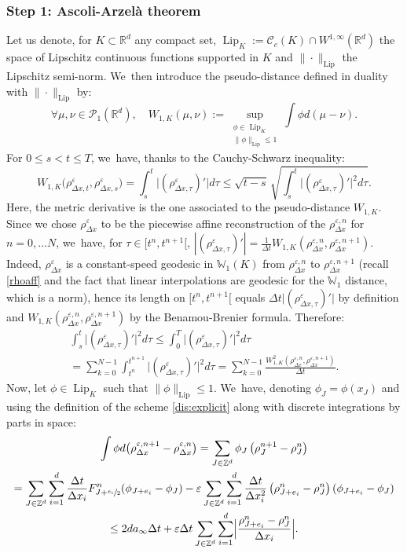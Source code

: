\documentclass[11pt]{article}
\numberwithin{equation}{section}
\DeclareMathOperator{\Lip}{Lip}
\def\RR{\mathbb{R}}
\def\ZZ{\mathbb{Z}}
\def\WW{\mathbb{W}}
\def\eps{\varepsilon}
\def\lip{\mathrm{Lip}}
\def\dt{\Delta t}
\def\dx{\Delta x}
\def\calC{{\mathcal C}}
\def\calP{{\mathcal P}}
\theoremstyle{plain}
\theoremstyle{definition}
\begin{document}
\subsubsection*{Step 1: Ascoli-Arzelà theorem} Let us denote, for $K \subset \RR^d$ any compact set, $\Lip_K := \calC_c(K) \cap W^{1,\infty}(\RR^d)$ the space of Lipschitz continuous functions supported in $K$ and $\|\cdot\|_{\lip}$ the Lipschitz semi-norm. We~then introduce the pseudo-distance defined in duality with $\|{\cdot}\|_{\lip}$ by:
\[
\forall \mu, \nu \in \calP_1(\RR^d), \quad W_{1,K}(\mu, \nu) := \sup_{\substack{\phi \in \Lip_K\\ \|\phi\|_{\lip} \leq 1}} \int \phi d(\mu-\nu).
\]
For $0\leq s < t \leq T$, we~have, thanks to the Cauchy-Schwarz inequality:
\begin{equation}\label{ineq:HolderW1K}
W_{1,K}\big(\rho_{\dx,t}^\eps, \rho_{\dx,s}^\eps\big) = \int_s^t \big|(\rho_{\dx, \tau}^\eps)'\big| d\tau \leq \sqrt{t-s} \, \sqrt{\int_s^t \big|(\rho_{\dx,\tau}^\eps)'\big|^2 d\tau}.
\end{equation}
Here, the metric derivative is the one associated to the pseudo-distance $W_{1,K}$. Since we chose $\rho_{\dx}^\eps$ to be the piecewise affine reconstruction of the $\rho_{\dx}^{\eps,n}$ for $n=0, \ldots N$, we~have, for $\tau \in [t^n, t^{n+1}[$, $ |(\rho_{\dx,\tau}^\eps)'| = \frac{1}{\dt} W_{1,K}(\rho_{\dx}^{\eps,n}, \rho_{\dx}^{\eps,n+1})$. Indeed, $\rho_{\dx}^\eps$ is a constant-speed geodesic in $\WW_1(K)$ from $\rho_{\dx}^{\eps,n}$ to $\rho_{\dx}^{\eps,n+1}$ (recall \eqref{rhoaff} and the fact that linear interpolations are geodesic for the $\WW_1$ distance, which is a norm), hence its length on $[t^n, t^{n+1}[$ equals $\dt\big|(\rho_{\dx,\tau}^\eps)'\big|$ by definition and $W_{1,K}(\rho_{\dx}^{\eps,n}, \rho_{\dx}^{\eps,n+1})$ by the Benamou-Brenier formula. Therefore:
\begin{multline}\label{eq:pff}
\int_s^t \big|(\rho_{\dx,\tau}^\eps)'\big|^2 d\tau \leq \int_0^T \big|(\rho_{\dx,\tau}^\eps)'\big|^2 d\tau \\
= \sum_{k=0}^{N-1} \int_{t^n}^{t^{n+1}} \big|(\rho_{\dx,\tau}^\eps)'\big|^2 d\tau = \sum_{k=0}^{N-1} \frac{W_{1,K}^2(\rho_{\dx}^{\eps,n}, \rho_{\dx}^{\eps,n+1})}{\dt}.
\end{multline}
Now, let $\phi \in \Lip_K$ such that $\|\phi\|_{\lip} \leq 1$. We~have, denoting $\phi_J = \phi(x_J)$ and using the definition of the scheme \eqref{dis:explicit} along with discrete integrations by parts in space:
\begin{multline*}
\int \phi d\big(\rho_{\dx}^{\eps,n+1}-\rho_{\dx}^{\eps,n}\big) = \sum_{J\in\ZZ^d} \phi_J \left(\rho_J^{n+1} - \rho_J^{n}\right) \\
= \sum_{J \in \ZZ^d} \sum_{i=1}^{d} \frac{\dt}{\dx_i}
F_{J+ \sfrac{e_i}{2}}^{n}(\phi_{J+e_i} - \phi_J) - \eps \sum_{J \in \ZZ^d} \sum_{i=1}^{d} \frac{\dt}{\dx_i^2} \left(\rho_{J+e_i}^{n} - \rho_J^{n}\right)(\phi_{J+e_i} - \phi_J) \\
\leq 2da_\infty \dt + \eps \dt \sum_{J \in \ZZ^d} \sum_{i=1}^{d} \Bigl|\frac{\rho_{J+e_i}^{n} - \rho_J^{n}}{\dx_i}\Bigr|.
\end{multline*}
\end{document}
